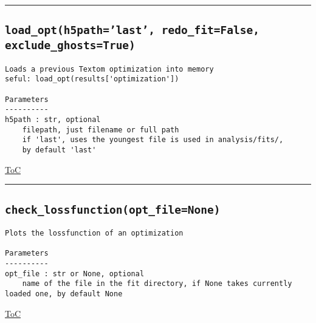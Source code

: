\documentclass{article}
\begin{document}


\vspace{5mm}

\hrule

\subsection*{\texttt{load\_opt(h5path='last', redo\_fit=False, exclude\_ghosts=True)}}
\label{fun:loadopt}

\begin{lstlisting}[language=docstring]
Loads a previous Textom optimization into memory
seful: load_opt(results['optimization'])

Parameters
----------
h5path : str, optional
    filepath, just filename or full path
    if 'last', uses the youngest file is used in analysis/fits/, 
    by default 'last'
\end{lstlisting}

\begin{flushright}

\hyperref[toc]{ToC}

\end{flushright}



\vspace{5mm}

\hrule

\subsection*{\texttt{check\_lossfunction(opt\_file=None)}}
\label{fun:checklossfunction}

\begin{lstlisting}[language=docstring]
Plots the lossfunction of an optimization

Parameters
----------
opt_file : str or None, optional
    name of the file in the fit directory, if None takes currently loaded one, by default None
\end{lstlisting}

\begin{flushright}

\hyperref[toc]{ToC}

\end{flushright}


\end{document}
